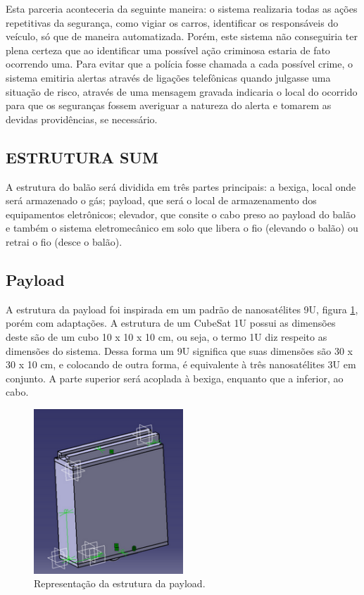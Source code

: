     Esta parceria aconteceria da seguinte maneira: o sistema realizaria todas as ações repetitivas da segurança, como vigiar os carros, identificar os responsáveis do veículo, só que de maneira automatizada. Porém, este sistema não conseguiria ter plena certeza que ao identificar uma possível ação criminosa estaria de fato ocorrendo uma. Para evitar que a polícia fosse chamada a cada possível crime, o sistema emitiria alertas através de ligações telefônicas quando julgasse uma situação de risco, através de uma mensagem gravada indicaria o local do ocorrido para que os seguranças fossem averiguar a natureza do alerta e tomarem as devidas providências, se necessário.
  
\subsection{ESTRUTURA SUM}

   A estrutura do balão será dividida em três partes principais: a bexiga, local onde será armazenado o gás; payload, que será o local de armazenamento dos equipamentos eletrônicos; elevador, que consite o cabo preso ao payload do balão e também o sistema eletromecânico em solo que libera o fio (elevando o balão) ou retrai o fio (desce o balão).

\subsection{Payload}
  
    A estrutura da payload foi inspirada em um padrão de nanosatélites 9U, figura \ref{img:payload}, porém com adaptações. A estrutura de um CubeSat 1U possui as dimensões deste são de um cubo 10 x 10 x 10 cm, ou seja, o termo 1U diz respeito as dimensões do sistema. Dessa forma um 9U significa que suas dimensões são 30 x 30 x 10 cm, e colocando de outra forma, é equivalente à três nanosatélites 3U em conjunto. A parte superior será acoplada à bexiga, enquanto que a inferior, ao cabo.

  \begin{figure}[H]
    \centering
    \includegraphics[width=0.5\textwidth]{figuras/payload}
    \caption{Representação da estrutura da payload. }
    \label{img:payload}
  \end{figure}



